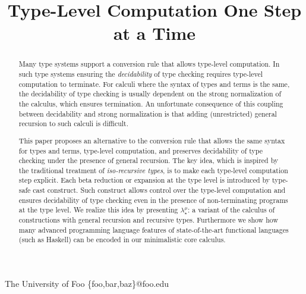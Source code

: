 \documentclass[preprint]{sigplanconf}
\newcommand{\name}{{\bf $\lambda_{\star}^{\mu}$}\xspace}
\begin{document}


\preprintfooter{} %

\title{Type-Level Computation One Step at a Time}

           {The University of Foo}
           {\{foo,bar,baz\}@foo.edu}

\maketitle

\begin{abstract}
Many type systems support a conversion rule that allows type-level
computation. In such type systems ensuring the \emph{decidability} of
type checking requires type-level computation to terminate.
For calculi where the syntax of types and terms is the same, the
decidability of type checking is usually dependent on the strong normalization
of the calculus, which ensures termination. An unfortunate
consequence of this coupling between decidability and strong
normalization is that adding (unrestricted) general recursion to such
calculi is difficult.

This paper proposes an alternative to the conversion rule that allows
the same syntax for types and terms, type-level computation, and
preserves decidability of type checking under the presence of general
recursion. The key idea, which is inspired by the traditional
treatment of \emph{iso-recursive types}, is to make each type-level
computation step explicit. Each beta reduction or expansion at the
type level is introduced by type-safe cast construct. Such construct allows control
over the type-level computation and ensures decidability of
type checking even in the presence of non-terminating programs at the
type level.  We realize this idea by presenting \name: a variant of the
calculus of constructions with general recursion and recursive types.
Furthermore we show how many advanced programming language features of
state-of-the-art functional languages (such as Haskell) can be encoded
in our minimalistic core calculus.
\end{abstract}
\end{document}
